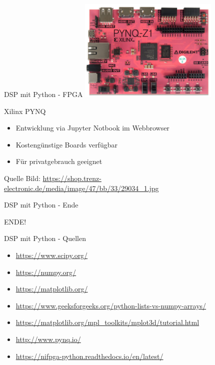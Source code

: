 \documentclass[8pt]{beamer}
\begin{document}
\begin{frame}[label={sec:orgef6bc92}]{DSP mit Python - FPGA}
\includegraphics[width = 0.5\textwidth]{image/pynq.jpg}
\begin{block}{Xilinx PYNQ}
\begin{itemize}
\item Entwicklung via Jupyter Notbook im Webbrowser
\item Kostengünstige Boards verfügbar
\item Für privatgebrauch geeignet
\end{itemize}

\vspace{15mm}
Quelle Bild:
\url{https://shop.trenz-electronic.de/media/image/47/bb/33/29034\_1.jpg}
\end{block}
\end{frame}


\begin{frame}[label={sec:org465a824}]{DSP mit Python - Ende}
\begin{block}{ENDE!}
\end{block}
\end{frame}


\begin{frame}[label={sec:org0861488}]{DSP mit Python - Quellen}
\begin{itemize}
\item \url{https://www.scipy.org/}
\item \url{https://numpy.org/}
\item \url{https://matplotlib.org/}
\item \url{https://www.geeksforgeeks.org/python-lists-vs-numpy-arrays/}
\item \url{https://matplotlib.org/mpl\_toolkits/mplot3d/tutorial.html}
\item \url{http://www.pynq.io/}
\item \url{https://nifpga-python.readthedocs.io/en/latest/}
\end{itemize}
\end{frame}
\end{document}
